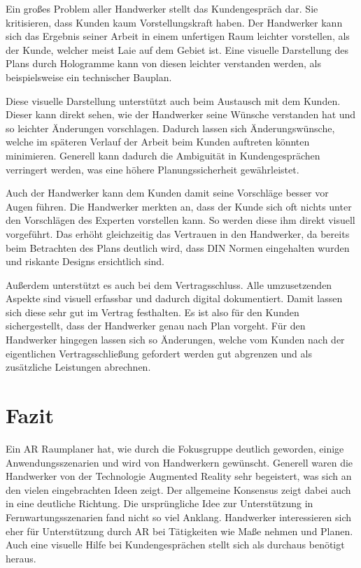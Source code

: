 Ein großes Problem aller Handwerker stellt das Kundengespräch dar. Sie kritisieren, dass Kunden kaum Vorstellungskraft haben. Der Handwerker kann sich das Ergebnis seiner Arbeit in einem unfertigen Raum leichter vorstellen, als der Kunde, welcher meist Laie auf dem Gebiet ist. Eine visuelle Darstellung des Plans durch Hologramme kann von diesen leichter verstanden werden, als beispielsweise ein technischer Bauplan. 

Diese visuelle Darstellung unterstützt auch beim Austausch mit dem Kunden. Dieser kann direkt sehen, wie der Handwerker seine Wünsche verstanden hat und so leichter Änderungen vorschlagen. Dadurch lassen sich Änderungswünsche, welche im späteren Verlauf der Arbeit beim Kunden auftreten könnten minimieren. Generell kann dadurch die Ambiguität in Kundengesprächen verringert werden, was eine höhere Planungssicherheit gewährleistet. 

Auch der Handwerker kann dem Kunden damit seine Vorschläge besser vor Augen führen. Die Handwerker merkten an, dass der Kunde sich oft nichts unter den Vorschlägen des Experten vorstellen kann. So werden diese ihm direkt visuell vorgeführt. Das erhöht gleichzeitig das Vertrauen in den Handwerker, da bereits beim Betrachten des Plans deutlich wird, dass DIN Normen eingehalten wurden und riskante Designs ersichtlich sind. 

Außerdem unterstützt es auch bei dem Vertragsschluss. Alle umzusetzenden Aspekte sind visuell erfassbar und dadurch digital dokumentiert. Damit lassen sich diese sehr gut im Vertrag festhalten. Es ist also für den Kunden sichergestellt, dass der Handwerker genau nach Plan vorgeht. Für den Handwerker hingegen lassen sich so Änderungen, welche vom Kunden nach der eigentlichen Vertragsschließung gefordert werden gut abgrenzen und als zusätzliche Leistungen abrechnen. 

\section{Fazit}

Ein AR Raumplaner hat, wie durch die Fokusgruppe deutlich geworden, einige Anwendungsszenarien und wird von Handwerkern gewünscht. Generell waren die Handwerker von der Technologie Augmented Reality sehr begeistert, was sich an den vielen eingebrachten Ideen zeigt. Der allgemeine Konsensus zeigt dabei auch in eine deutliche Richtung. Die ursprüngliche Idee zur Unterstützung in Fernwartungsszenarien fand nicht so viel Anklang. Handwerker interessieren sich eher für Unterstützung durch AR bei Tätigkeiten wie Maße nehmen und Planen. Auch eine visuelle Hilfe bei Kundengesprächen stellt sich als durchaus benötigt heraus. 

